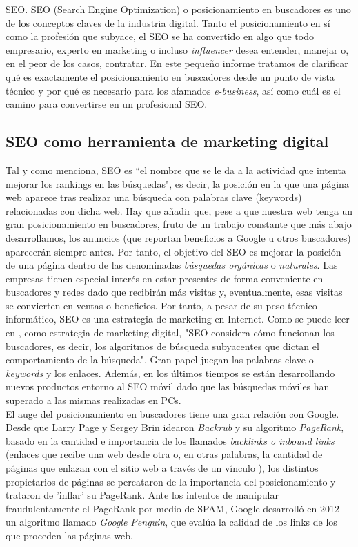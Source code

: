 	\newpage
	
	\begin{section}{SEO.}
		SEO (Search Engine Optimization) o posicionamiento en buscadores es uno de los conceptos claves de la industria digital. Tanto el posicionamiento en sí como la profesión que subyace, el SEO se ha convertido en algo que todo empresario, experto en marketing o incluso \textit{influencer} desea entender, manejar o, en el peor de los casos, contratar. En este pequeño informe tratamos de clarificar qué es exactamente el posicionamiento en buscadores desde un punto de vista técnico y por qué es necesario para los afamados \textit{e-business}, así como cuál es el camino para convertirse en un profesional SEO.
		
		\subsection{SEO como herramienta de marketing digital}
		Tal y como \cite{redevolution} menciona, SEO es ``el nombre que se le da a la actividad que intenta mejorar los rankings en las búsquedas", es decir, la posición en la que una página web aparece tras realizar una búsqueda con palabras clave (keywords) relacionadas con dicha web. Hay que añadir que, pese a que nuestra web tenga un gran posicionamiento en buscadores, fruto de un trabajo constante que más abajo desarrollamos, los anuncios (que reportan beneficios a Google u otros buscadores) aparecerán siempre antes. Por tanto, el objetivo del SEO es mejorar la posición de una página dentro de las denominadas \textit{búsquedas orgánicas} o \textit{naturales}. Las empresas tienen especial interés en estar presentes de forma conveniente en buscadores y redes dado que recibirán más visitas y, eventualmente, esas visitas se convierten en ventas o beneficios. Por tanto, a pesar de su peso técnico-informático, SEO es una estrategia de marketing en Internet. Como se puede leer en \cite{wiki}, como estrategia de marketing digital, "SEO considera cómo funcionan los buscadores, es decir, los algoritmos de búsqueda subyacentes que dictan el comportamiento de la búsqueda". Gran papel juegan las palabras clave o \textit{keywords} y los enlaces. Además, en los últimos tiempos se están desarrollando nuevos productos entorno al SEO móvil dado que las búsquedas móviles han superado a las mismas realizadas en PCs. \\
		
		El auge del posicionamiento en buscadores tiene una gran relación con Google. Desde que Larry Page y Sergey Brin idearon \textit{Backrub} y su algoritmo \textit{PageRank}, basado en la cantidad e importancia de los llamados \textit{backlinks o inbound links} (enlaces que recibe una web desde otra o, en otras palabras, la cantidad de páginas que enlazan con el sitio web a través de un vínculo \cite{backl}), los distintos propietarios de páginas se percataron de la importancia del posicionamiento y trataron de 'inflar' su PageRank. Ante los intentos de manipular fraudulentamente el PageRank por medio de SPAM, Google desarrolló en 2012 un algoritmo llamado \textit{Google Penguin}, que evalúa la calidad de los links de los que proceden las páginas web.
		

\end{section}
